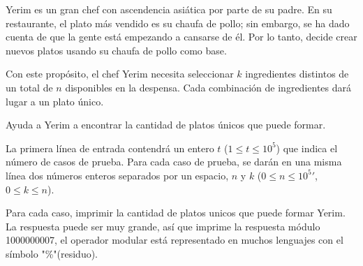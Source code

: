 
Yerim es un gran chef con ascendencia asiática por parte de su padre. En su restaurante, el plato más vendido es su chaufa de pollo; sin embargo, se ha dado cuenta de que la gente está empezando a cansarse de él. Por lo tanto, decide crear nuevos platos usando su chaufa de pollo como base.

Con este propósito, el chef Yerim necesita seleccionar $k$ ingredientes distintos de un total de $n$ disponibles en la despensa. Cada combinación de ingredientes dará lugar a un plato único.

Ayuda a Yerim a encontrar la cantidad de platos únicos que puede formar.




La primera línea de entrada contendrá un entero $t$ ($1\leq t \leq 10^5$) que indica el número de casos de prueba. Para cada caso de prueba, se darán en una misma línea dos números enteros separados por un espacio, $n$ y $k$ ($0 \leq n \leq 10^5'$, $0 \leq k \leq n$).

\outputText

Para cada caso, imprimir la cantidad de platos unicos que puede formar Yerim.\\
La respuesta puede ser muy grande, así que imprime la respuesta módulo 1000000007, el operador modular está representado en muchos lenguajes con el símbolo "\%"(residuo).

\exampleCases

\begin{example}
\end{example}


